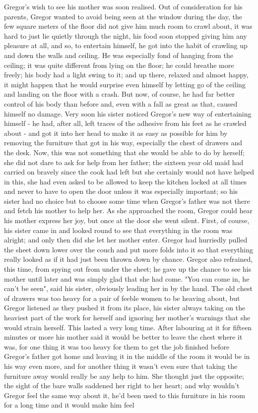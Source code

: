 Gregor's wish to see his mother was soon realised. Out of consideration for his parents, Gregor wanted to avoid being seen at the window during the day, the few square meters of the floor did not give him much room to crawl about, it was hard to just lie quietly through the night, his food soon stopped giving him any pleasure at all, and so, to entertain himself, he got into the habit of crawling up and down the walls and ceiling. He was especially fond of hanging from the ceiling; it was quite different from lying on the floor; he could breathe more freely; his body had a light swing to it; and up there, relaxed and almost happy, it might happen that he would surprise even himself by letting go of the ceiling and landing on the floor with a crash. But now, of course, he had far better control of his body than before and, even with a fall as great as that, caused himself no damage. Very soon his sister noticed Gregor's new way of entertaining himself - he had, after all, left traces of the adhesive from his feet as he crawled about - and got it into her head to make it as easy as possible for him by removing the furniture that got in his way, especially the chest of drawers and the desk. Now, this was not something that she would be able to do by herself; she did not dare to ask for help from her father; the sixteen year old maid had carried on bravely since the cook had left but she certainly would not have helped in this, she had even asked to be allowed to keep the kitchen locked at all times and never to have to open the door unless it was especially important; so his sister had no choice but to choose some time when Gregor's father was not there and fetch his mother to help her. As she approached the room, Gregor could hear his mother express her joy, but once at the door she went silent. First, of course, his sister came in and looked round to see that everything in the room was alright; and only then did she let her mother enter. Gregor had hurriedly pulled the sheet down lower over the couch and put more folds into it so that everything really looked as if it had just been thrown down by chance. Gregor also refrained, this time, from spying out from under the sheet; he gave up the chance to see his mother until later and was simply glad that she had come. "You can come in, he can't be seen", said his sister, obviously leading her in by the hand. The old chest of drawers was too heavy for a pair of feeble women to be heaving about, but Gregor listened as they pushed it from its place, his sister always taking on the heaviest part of the work for herself and ignoring her mother's warnings that she would strain herself. This lasted a very long time. After labouring at it for fifteen minutes or more his mother said it would be better to leave the chest where it was, for one thing it was too heavy for them to get the job finished before Gregor's father got home and leaving it in the middle of the room it would be in his way even more, and for another thing it wasn't even sure that taking the furniture away would really be any help to him. She thought just the opposite; the sight of the bare walls saddened her right to her heart; and why wouldn't Gregor feel the same way about it, he'd been used to this furniture in his room for a long time and it would make him feel 